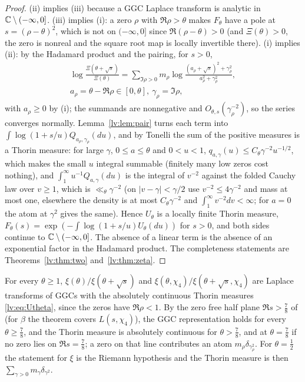 \begin{proof}
(ii) implies (iii) because a GGC Laplace transform is analytic in $\mathbb{C}\setminus(-\infty,0]$. (iii) implies (i): a zero $\rho$ with $\Re\rho>\theta$ makes $F_\theta$ have a pole at $s=(\rho-\theta)^2$, which is not on $(-\infty,0]$ since $\Re(\rho-\theta)>0$ (and $\Xi(\theta)>0$, the zero is nonreal and the square root map is locally invertible there). (i) implies (ii): by the Hadamard product and the pairing, for $s>0$,
\[
\begin{gathered}\log\frac{\Xi(\theta+\sqrt s)}{\Xi(\theta)}=\sum_{\Im\rho>0}m_\rho\log\frac{(a_\rho+\sqrt s)^2+\gamma_\rho^2}{a_\rho^2+\gamma_\rho^2},\\ a_\rho=\theta-\Re\rho\in[0,\theta],\ \gamma_\rho=\Im\rho,\end{gathered}
\]
with $a_\rho\ge0$ by (i); the summands are nonnegative and $O_{\theta,s}(\gamma_\rho^{-2})$, so the series converges normally. Lemma~\ref{lv:lem:pair} turns each term into $\int\log(1+s/u)Q_{a_\rho,\gamma_\rho}(du)$, and by Tonelli the sum of the positive measures is a Thorin measure: for large $\gamma$, $0\le a\le\theta$ and $0<u<1$, $q_{a,\gamma}(u)\le C_\theta\gamma^{-2}u^{-1/2}$, which makes the small $u$ integral summable (finitely many low zeros cost nothing), and $\int_1^\infty u^{-1}Q_{a,\gamma}(du)$ is the integral of $v^{-2}$ against the folded Cauchy law over $v\ge1$, which is $\ll_\theta\gamma^{-2}$ (on $|v-\gamma|<\gamma/2$ use $v^{-2}\le4\gamma^{-2}$ and mass at most one, elsewhere the density is at most $C_\theta\gamma^{-2}$ and $\int_1^\infty v^{-2}dv<\infty$; for $a=0$ the atom at $\gamma^2$ gives the same). Hence $U_\theta$ is a locally finite Thorin measure, $F_\theta(s)=\exp(-\int\log(1+s/u)U_\theta(du))$ for $s>0$, and both sides continue to $\mathbb{C}\setminus(-\infty,0]$. The absence of a linear term is the absence of an exponential factor in the Hadamard product. The completeness statements are Theorems~\ref{lv:thm:two} and~\ref{lv:thm:zeta}.
\end{proof}

\begin{corollary}\label{lv:cor:uncond}
For every $\theta\ge1$, $\xi(\theta)/\xi(\theta+\sqrt s)$ and $\xi(\theta,\chi_4)/\xi(\theta+\sqrt s,\chi_4)$ are Laplace transforms of GGCs with the absolutely continuous Thorin measures \eqref{lv:eq:Utheta}, since the zeros have $\Re\rho<1$. By the zero free half plane $\Re s>\frac78$ of \cite{OAI26a} (for $\beta$ the theorem covers $L(s,\chi_4)$), the GGC representation holds for every $\theta\ge\frac78$, and the Thorin measure is absolutely continuous for $\theta>\frac78$, and at $\theta=\frac78$ if no zero lies on $\Re s=\frac78$; a zero on that line contributes an atom $m_\rho\delta_{\gamma_\rho^2}$. For $\theta=\frac12$ the statement for $\xi$ is the Riemann hypothesis and the Thorin measure is then $\sum_{\gamma>0}m_\gamma\delta_{\gamma^2}$.
\end{corollary}

